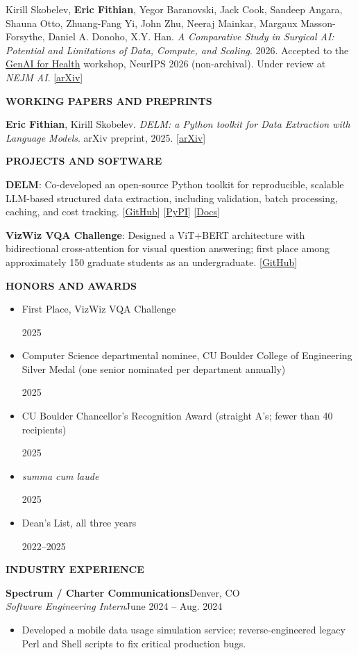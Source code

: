 \documentclass[11pt,letterpaper]{article}
\newcommand{\resumesection}[1]{%
  \par\addvspace{1.25ex}\Needspace{4\baselineskip}%
  {\bfseries #1}\par\nobreak\vspace{0.6ex}%
}
\newcommand{\paper}[1]{%
  \begin{minipage}{\linewidth}#1\end{minipage}\par\vspace{0.65em}%
}
\newcommand{\awarditem}[2]{\item \parbox[t]{\dimexpr\linewidth-5em\relax}{#1}\hfill #2}
\begin{document}
\paper{Kirill Skobelev, \textbf{Eric Fithian}, Yegor Baranovski, Jack Cook, Sandeep Angara, Shauna Otto, Zhuang-Fang Yi, John Zhu, Neeraj Mainkar, Margaux Masson-Forsythe, Daniel A. Donoho, X.Y. Han. \textit{A Comparative Study in Surgical AI: Potential and Limitations of Data, Compute, and Scaling}. 2026. Accepted to the \href{https://genai4health.github.io/2026-NeurIPS/}{GenAI for Health} workshop, NeurIPS 2026 (non-archival). Under review at \textit{NEJM AI}. [\href{https://arxiv.org/abs/2603.27341}{arXiv}]}

\resumesection{WORKING PAPERS AND PREPRINTS}
\paper{\textbf{Eric Fithian}, Kirill Skobelev. \textit{DELM: a Python toolkit for Data Extraction with Language Models}. arXiv preprint, 2025. [\href{https://arxiv.org/abs/2509.20617}{arXiv}]}

\resumesection{PROJECTS AND SOFTWARE}
\textbf{DELM}: Co-developed an open-source Python toolkit for reproducible, scalable LLM-based structured data extraction, including validation, batch processing, caching, and cost tracking. [\href{https://github.com/Center-for-Applied-AI/delm}{GitHub}] [\href{https://pypi.org/project/delm/}{PyPI}] [\href{https://center-for-applied-ai.github.io/delm/}{Docs}]\par\vspace{0.4em}
\textbf{VizWiz VQA Challenge}: Designed a ViT+BERT architecture with bidirectional cross-attention for visual question answering; first place among approximately 150 graduate students as an undergraduate. [\href{https://github.com/Eric-Fithian/Lab3-VizWiz}{GitHub}]\par\vspace{0.4em}

\resumesection{HONORS AND AWARDS}
\begin{itemize}
  \awarditem{First Place, VizWiz VQA Challenge}{2025}
  \awarditem{Computer Science departmental nominee, CU Boulder College of Engineering Silver Medal (one senior nominated per department annually)}{2025}
  \awarditem{CU Boulder Chancellor's Recognition Award (straight A's; fewer than 40 recipients)}{2025}
  \awarditem{\textit{summa cum laude}}{2025}
  \awarditem{Dean's List, all three years}{2022--2025}
\end{itemize}

\resumesection{INDUSTRY EXPERIENCE}
\textbf{Spectrum / Charter Communications}\hfill Denver, CO\\
\textit{Software Engineering Intern}\hfill June 2024 -- Aug. 2024
\begin{itemize}
  \item Developed a mobile data usage simulation service; reverse-engineered legacy Perl and Shell scripts to fix critical production bugs.
\end{itemize}
\end{document}
